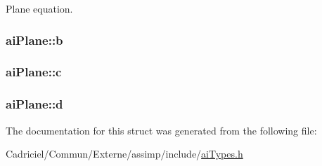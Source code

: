 Plane equation. 

\hypertarget{structai_plane_a84ab33cd9b2f5325282b489f8a2bf11c}{
\subsubsection[{b}]{ ai\-Plane\-::b}}\label{structai_plane_a84ab33cd9b2f5325282b489f8a2bf11c}
\hypertarget{structai_plane_a7b0ea36c355ca003a5789088fb24da1f}{
\subsubsection[{c}]{ ai\-Plane\-::c}}\label{structai_plane_a7b0ea36c355ca003a5789088fb24da1f}
\hypertarget{structai_plane_ab8696b583b6fab46ae30cd5b691e7c9a}{
\subsubsection[{d}]{ ai\-Plane\-::d}}\label{structai_plane_ab8696b583b6fab46ae30cd5b691e7c9a}


The documentation for this struct was generated from the following file\-:\begin{DoxyCompactItemize}
\item 
Cadriciel/\-Commun/\-Externe/assimp/include/\hyperlink{ai_types_8h}{ai\-Types.\-h}\end{DoxyCompactItemize}
